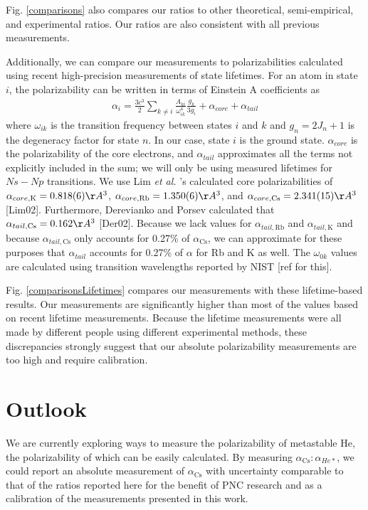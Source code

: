 \documentclass[twocolumn, prl,showpacs,superscriptaddress]{revtex4-1}   %
\newcommand{\figref}[1]{Fig. \ref{#1}}
\newcommand{\acs}{\alpha_{\textrm{Cs}}}
\newcommand{\etal}{\textit{et al. }}
\begin{document}
\figref{comparisons} also compares our ratios to other theoretical, semi-empirical, and experimental ratios. Our ratios are also consistent with all previous measurements.

Additionally, we can compare our measurements to polarizabilities calculated using recent high-precision measurements of state lifetimes. For an atom in state $i$, the polarizability can be written in terms of Einstein A coefficients as
\begin{align}
	\alpha_i = \frac{3c^3}{2} \sum_{k\neq i} 
	\frac{A_{ki}}{\omega_{ik}^4} \frac{g_k}{3g_i}
	+ \alpha_{core}
	+ \alpha_{tail}
	\label{polFromLifetimes}
\end{align}
where $\omega_{ik}$ is the transition frequency between states $i$ and $k$ and $g_n = 2J_n+1$ is the degeneracy factor for state $n$. In our case, state $i$ is the ground state. $\alpha_{core}$ is the polarizability of the core electrons, and $\alpha_{tail}$ approximates all the terms not explicitly included in the sum; we will only be using measured lifetimes for $Ns-Np$ transitions.
We use Lim \etal's calculated core polarizabilities of 
$\alpha_{core,\mathrm{K}} = 0.818(6) \AA^3$, 
$\alpha_{core,\mathrm{Rb}} = 1.350(6) \AA^3$, and 
$\alpha_{core,\mathrm{Cs}} = 2.341(15) \AA^3$ [Lim02]. 
Furthermore, Derevianko and Porsev calculated that 
$\alpha_{tail,\mathrm{Cs}} = 0.162 \AA^3$ [Der02]. Because we lack values for $\alpha_{tail,\mathrm{Rb}}$ and $\alpha_{tail,\mathrm{K}}$ and because $\alpha_{tail,\mathrm{Cs}}$ only accounts for 0.27\% of $\acs$, we can approximate for these purposes that $\alpha_{tail}$ accounts for 0.27\% of $\alpha$ for Rb and K as well. The $\omega_{0k}$ values are calculated using transition wavelengths reported by NIST [ref for this]. 

\figref{comparisonsLifetimes} compares our measurements with these lifetime-based results. Our measurements are significantly higher than most of the values based on recent lifetime measurements. Because the lifetime measurements were all made by different people using different experimental methods, these discrepancies strongly suggest that our absolute polarizability measurements are too high and require calibration.

\section{Outlook}

We are currently exploring ways to measure the polarizability of metastable He, the polarizability of which can be easily calculated. By measuring $\acs:\alpha_{He*}$, we could report an absolute measurement of $\acs$ with uncertainty comparable to that of the ratios reported here for the benefit of PNC research and as a calibration of the measurements presented in this work.
\end{document}
